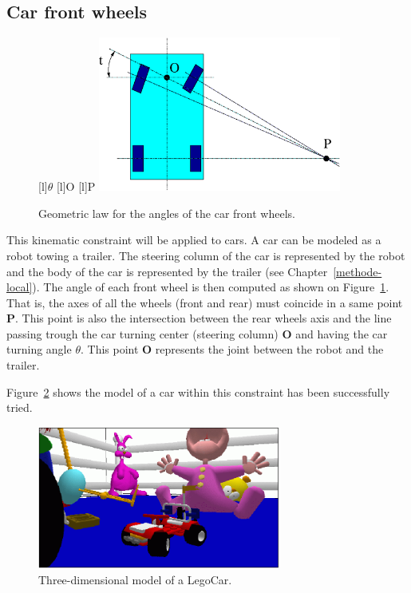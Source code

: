 \subsection*{Car front wheels}

\begin{figure}[ht!]
\begin{center}
[l]{$\theta$} 
[l]{O} 
[l]{P}    
  \includegraphics[width=8cm]{FIG/Constraint/carfw.eps}
\end{center}
\caption{\label{fig:carfw} Geometric law for the angles of the car 
  front wheels.}
\end{figure}

This kinematic constraint will be applied to cars. A car can be
modeled as a robot towing a trailer. The steering column of the car is
represented by the robot and the body of the car is represented by the
trailer (see Chapter~\ref{methode-local}). The angle of each
front wheel is then computed as shown on Figure~\ref{fig:carfw}.
That is, the axes of all the wheels (front and rear) must coincide in
a same point {\bf P}.  This point is also the intersection between the
rear wheels axis and the line passing trough the car turning center
(steering column) {\bf O} and having the car turning angle $\theta$.
This point {\bf O} represents the joint between the robot and the
trailer.

Figure~\ref{fig:LegoCar} shows the model of a car
within this constraint has been successfully tried.



\begin{figure}[htb!]
\begin{center}
  \includegraphics[width=8cm]{FIG/Constraint/LegoCar.eps}
\end{center}
\caption{\label{fig:LegoCar} Three-dimensional model of a LegoCar.}
\end{figure}


